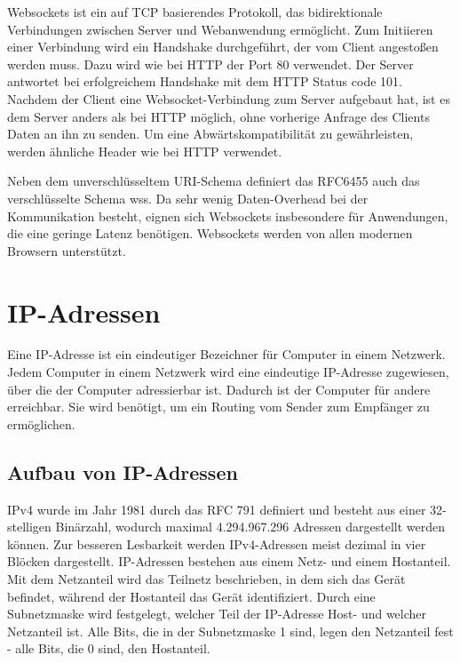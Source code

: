 Websockets ist ein auf TCP basierendes Protokoll, das bidirektionale Verbindungen zwischen Server und Webanwendung ermöglicht. Zum Initiieren einer Verbindung wird ein Handshake durchgeführt, der vom Client angestoßen werden muss. Dazu wird wie bei HTTP der Port 80 verwendet. Der Server antwortet bei erfolgreichem Handshake mit dem HTTP Status code 101. Nachdem der Client eine Websocket-Verbindung zum Server aufgebaut hat, ist es dem Server anders als bei HTTP möglich, ohne vorherige Anfrage des Clients Daten an ihn zu senden. Um eine Abwärtskompatibilität zu gewährleisten, werden ähnliche Header wie bei HTTP verwendet.

Neben dem unverschlüsseltem URI-Schema definiert das RFC6455\cite{rfcWebsockets} auch das verschlüsselte Schema wss. Da sehr wenig Daten-Overhead bei der Kommunikation besteht, eignen sich Websockets insbesondere für Anwendungen, die eine geringe Latenz benötigen. Websockets werden von allen modernen Browsern unterstützt.%

%
%
%
% 
%  

\section{IP-Adressen}
Eine IP-Adresse ist ein eindeutiger Bezeichner für Computer in einem Netzwerk. Jedem Computer in einem Netzwerk wird eine eindeutige IP-Adresse zugewiesen, über die der Computer adressierbar ist. Dadurch ist der Computer für andere erreichbar. Sie wird benötigt, um ein Routing vom Sender zum Empfänger zu ermöglichen. \cite{www}
\subsection{Aufbau von IP-Adressen}
IPv4 wurde im Jahr 1981 durch das RFC 791\cite{rfc791} definiert und besteht aus einer 32-stelligen Binärzahl, wodurch maximal 4.294.967.296 Adressen dargestellt werden können. Zur besseren Lesbarkeit werden IPv4-Adressen meist dezimal in vier Blöcken dargestellt. IP-Adressen bestehen aus einem Netz- und einem Hostanteil. Mit dem Netzanteil wird das Teilnetz beschrieben, in dem sich das Gerät befindet, während der Hostanteil das Gerät identifiziert. Durch eine Subnetzmaske wird festgelegt, welcher Teil der IP-Adresse Host- und welcher Netzanteil ist. Alle Bits, die in der Subnetzmaske 1 sind, legen den Netzanteil fest - alle Bits, die 0 sind, den Hostanteil.


